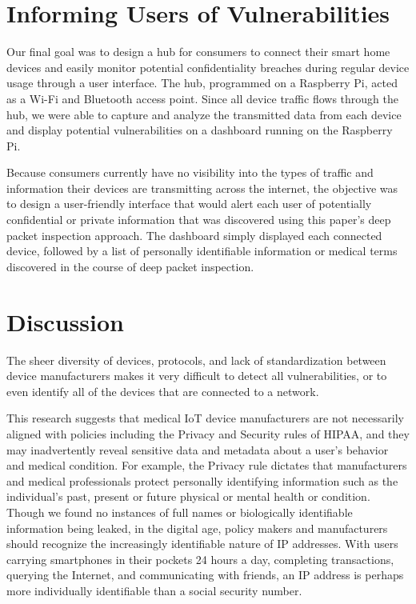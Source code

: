 \section{Informing Users of Vulnerabilities}

Our final goal was to design a hub for consumers to connect their smart home devices and easily monitor potential confidentiality breaches during regular device usage through a user interface. The hub, programmed on a Raspberry Pi, acted as a Wi-Fi and Bluetooth access point. Since all device traffic flows through the hub, we were able to capture and analyze the transmitted data from each device and display potential vulnerabilities on a dashboard running on the Raspberry Pi. 

Because consumers currently have no visibility into the types of traffic and information their devices are transmitting across the internet, the objective was to design a user-friendly interface that would alert each user of potentially confidential or private information that was discovered using this paper's deep packet inspection approach. The dashboard simply displayed each connected device, followed by a list of personally identifiable information or medical terms discovered in the course of deep packet inspection. 

\section{Discussion}

The sheer diversity of devices, protocols, and lack of standardization between device manufacturers makes it very difficult to detect all vulnerabilities, or to even identify all of the devices that are connected to a network.

This research suggests that medical IoT device manufacturers are not necessarily aligned with policies including the Privacy and Security rules of HIPAA, and they may inadvertently reveal sensitive data and metadata about a user's behavior and medical condition. For example, the Privacy rule dictates that manufacturers and medical professionals protect personally identifying information such as the individual's past, present or future physical or mental health or condition. Though we found no instances of full names or biologically identifiable information being leaked, in the digital age, policy makers and manufacturers should recognize the increasingly identifiable nature of IP addresses. With users carrying smartphones in their pockets 24 hours a day, completing transactions, querying the Internet, and communicating with friends, an IP address is perhaps more individually identifiable than a social security number.

